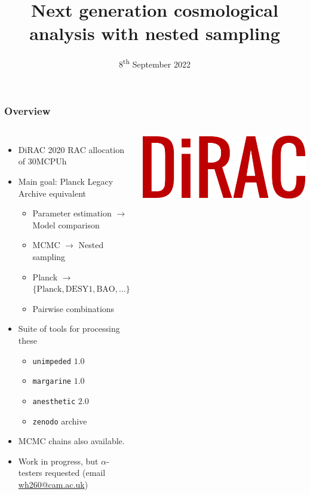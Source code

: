 \documentclass[aspectratio=169]{beamer}
\title{Next generation cosmological analysis with nested sampling}
\date{8\textsuperscript{th} September 2022}
\begin{document}
\begin{frame}
    \titlepage
\end{frame}

\begin{frame}
    \frametitle{Overview}
    \begin{columns}
        \begin{itemize}
            \item DiRAC 2020 RAC allocation of 30MCPUh
            \item Main goal: Planck Legacy Archive equivalent
                \vspace{-10pt}
                \begin{itemize}
                    \item Parameter estimation $\to$ Model comparison
                    \item MCMC $\to$ Nested sampling
                    \item Planck $\to$ $\{\text{Planck}, \text{DESY1}, \text{BAO}, \ldots \}$
                    \item Pairwise combinations
                \end{itemize}
            \item Suite of tools for processing these 
                \begin{itemize}
                    \item \texttt{unimpeded} $1.0$
                    \item \texttt{margarine} $1.0$
                    \item \texttt{anesthetic} $2.0$
                    \item \texttt{zenodo} archive
                \end{itemize}
            \item MCMC chains also available.
            \item Work in progress, but $\alpha$-testers requested (email \href{mailto:wh260@cam.ac.uk}{wh260@cam.ac.uk})
        \end{itemize}
        \includegraphics[width=\textwidth]{logos/dirac}

\end{columns}
\end{frame}
\end{document}
